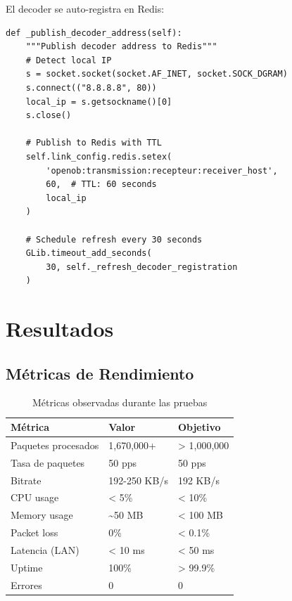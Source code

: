 \documentclass[12pt,a4paper]{article}
\begin{document}
El decoder se auto-registra en Redis:

\begin{lstlisting}[style=pythonstyle, caption={Auto-registro en Redis}, label={lst:autodiscovery}]
def _publish_decoder_address(self):
    """Publish decoder address to Redis"""
    # Detect local IP
    s = socket.socket(socket.AF_INET, socket.SOCK_DGRAM)
    s.connect(("8.8.8.8", 80))
    local_ip = s.getsockname()[0]
    s.close()
    
    # Publish to Redis with TTL
    self.link_config.redis.setex(
        'openob:transmission:recepteur:receiver_host',
        60,  # TTL: 60 seconds
        local_ip
    )
    
    # Schedule refresh every 30 seconds
    GLib.timeout_add_seconds(
        30, self._refresh_decoder_registration
    )
\end{lstlisting}

\newpage

\section{Resultados}

\subsection{Métricas de Rendimiento}

\begin{table}[H]
\centering
\caption{Métricas observadas durante las pruebas}
\label{tab:metrics}
\begin{tabular}{@{}lll@{}}
\toprule
\textbf{Métrica} & \textbf{Valor} & \textbf{Objetivo} \\ \midrule
Paquetes procesados & 1,670,000+ & > 1,000,000 \\
Tasa de paquetes & 50 pps & 50 pps \\
Bitrate & 192-250 KB/s & 192 KB/s \\
CPU usage & < 5\% & < 10\% \\
Memory usage & \textasciitilde50 MB & < 100 MB \\
Packet loss & 0\% & < 0.1\% \\
Latencia (LAN) & < 10 ms & < 50 ms \\
Uptime & 100\% & > 99.9\% \\
Errores & 0 & 0 \\
\bottomrule
\end{tabular}
\end{table}
\end{document}
